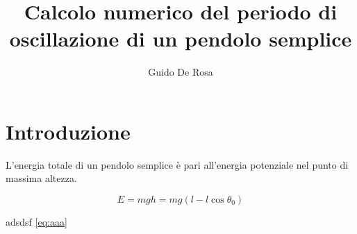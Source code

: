 \documentclass[a4paper,12pt]{article}
\author{Guido De Rosa}
\begin{document}
\title{Calcolo numerico del periodo di oscillazione di un pendolo semplice}

\maketitle

\section{Introduzione}

L'energia totale di un pendolo semplice è pari all'energia potenziale
nel punto di massima altezza.

\begin{equation}
  E = mgh = mg(l - l\cos{\theta_0}) \label{eq:aaa} 
\end{equation}

adsdsf \ref{eq:aaa}
\end{document}
